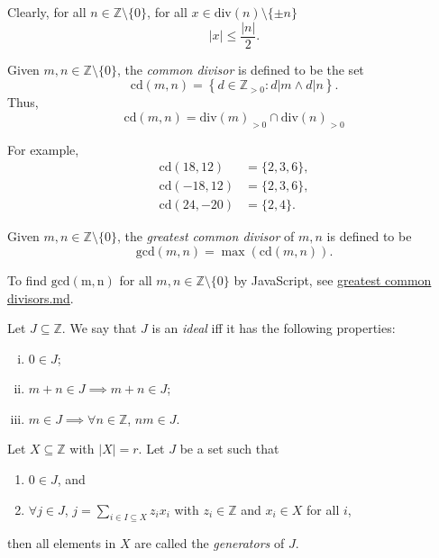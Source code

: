 Clearly, for all $n \in \mathbb Z \setminus \{0\}$, for all $x \in \mathrm{div}(n) \setminus \{\pm n\}$
$$
|x| \le \frac{|n|}{2}.
$$

\begin{definition}
	Given $m, n \in \mathbb Z \setminus \{0\}$, the \textit{common divisor} is defined to be the set
	$$
	\mathrm{cd}(m,n) = \left\{ d \in \mathbb Z_{> 0} : d|m \land d|n \right\}.
	$$
	Thus,
	$$
	\mathrm{cd}(m,n) = \mathrm{div}(m)_{> 0} \cap \mathrm{div}(n)_{>0}
	$$
\end{definition}


For example,
$$
\begin{aligned}
	\mathrm{cd}(18, 12) &= \{ 2, 3, 6 \}, \\
	\mathrm{cd}(-18, 12) &= \{ 2, 3, 6 \}, \\
	\mathrm{cd}(24, -20) &= \{ 2, 4 \}.
\end{aligned}
$$


\begin{definition}
	Given $m,n \in \mathbb Z \setminus \{0\}$, the \textit{greatest common divisor} of $m,n$ is defined to be
	$$
	\mathrm{gcd}(m,n) = \max(\mathrm{cd}(m,n)).
	$$
\end{definition}

To find $\mathrm{gcd(m,n)}$ for all $m,n \in \mathbb Z \setminus \{0\}$ by JavaScript, see \href{https://github.com/Wenchuan5000/TeX/blob/main/Algebra/reference/c1/s3/greatest%20common%20divisors.md}{greatest common divisors.md}.


\begin{definition}
	Let $J \subseteq \mathbb Z$. We say that $J$ is an \textit{ideal} iff it has the following properties:
	\begin{enumerate}[(i)]
		\item $0 \in J$;
		\item $m + n \in J \implies m + n \in J$;
		\item $m \in J \implies \forall n \in \mathbb Z$, $nm \in J$.
	\end{enumerate}
\end{definition}


\begin{definition}
	Let $X \subseteq \mathbb Z$ with $|X|= r$. Let $J$ be a set such that
	\begin{enumerate}
		\item $0 \in J$, and
		\item $\forall j \in J$, $j = \displaystyle \sum_{i \in I \subseteq X} z_ix_i$ with $z_i \in \mathbb Z$ and $x_i \in X$ for all $i$,
	\end{enumerate}
	then all elements in $X$ are called the \textit{generators} of $J$.
\end{definition}

